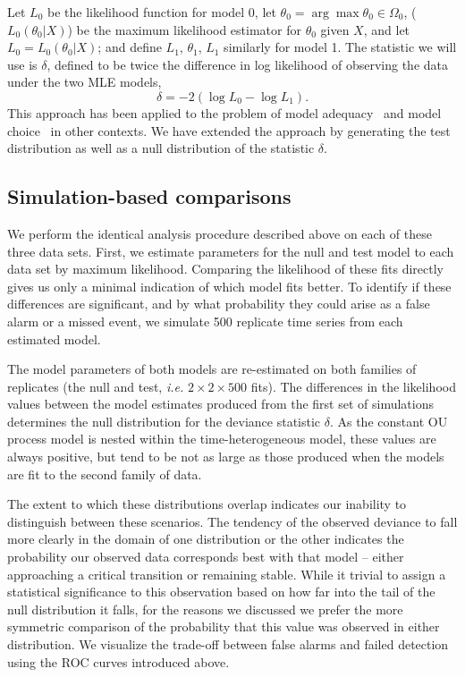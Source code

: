 \documentclass[authoryear,review,11pt]{elsarticle}
\begin{document}
Let $L_0$ be the likelihood function for model 0,
let $\theta_0 = \arg \max \theta_0 \in \Omega_0$, ($L_0 (\theta_0 |X)$)
be the maximum likelihood estimator for $\theta_0$ given $X$, and let $L_0 = L_0 (\theta_0 |X)$;
and define $L_1$, $\theta_1$, $L_1$ similarly for model 1.
The statistic we will use is $\delta$,
defined to be twice the difference in log likelihood of observing the data under the two MLE models,
\begin{equation}\label{delta}
\delta = -2 (\log L_0 - \log L_1 ).
\end{equation}
This approach has been applied to the problem of model adequacy~\citep{Goldman1993}
and model choice~\citep{Huelsenbeck1996} in other contexts.
We have extended the approach by generating the test distribution
as well as a null distribution of the statistic $\delta$.


\subsection{Simulation-based comparisons} \label{simbased}
We perform the identical analysis procedure described above on each of these three data sets.
First, we estimate parameters for the null and test model to each data set by maximum likelihood.
Comparing the likelihood of these fits directly gives us only a minimal indication of which model fits better. 
To identify if these differences are significant,
and by what probability they could arise as a false alarm or a missed event,
we simulate 500 replicate time series from each estimated model.

The model parameters of both models are re-estimated on both families of replicates
(the null and test, \emph{i.e.} $2 \times 2 \times 500$ fits).
The differences in the likelihood values between the model estimates produced from the first set of simulations
determines the null distribution for the deviance statistic $\delta$.
As the constant OU process model is nested within the time-heterogeneous model, these values are always positive,
but tend to be not as large as those produced when the models are fit to the second family of data.

The extent to which these distributions overlap indicates our inability to distinguish between these scenarios.
The tendency of the observed deviance to fall more clearly in the domain of one distribution or the other
indicates the probability our observed data corresponds best with that model  --
either approaching a critical transition or remaining stable.
While it trivial to assign a statistical significance to this observation based
on how far into the tail of the null distribution it falls,
for the reasons we discussed we prefer the more symmetric comparison of the probability that
this value was observed in either distribution.
We visualize the trade-off between false alarms and failed detection using the ROC curves introduced above.
\end{document}
